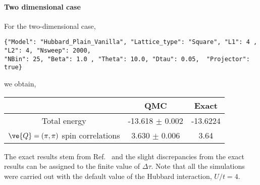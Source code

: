 \paragraph{Two dimensional case}  
For the two-dimensional case, 
\begin{lstlisting}[style=fortran]
{"Model": "Hubbard_Plain_Vanilla", "Lattice_type": "Square", "L1": 4 , "L2": 4, "Nsweep": 2000,  
"NBin": 25, "Beta": 1.0 , "Theta": 10.0, "Dtau": 0.05,  "Projector": true}
\end{lstlisting}
we obtain, \\
\begin{center}
\begin{tabular}{|c|c|c|}
\hline
                  &   QMC  & Exact  \\ \hline
Total energy & -13.618   $\pm $  0.002 &  -13.6224  \\ \hline
 $\ve{Q}=(\pi,\pi)$ spin correlations &  3.630     $ \pm $   0.006     & 3.64 \\ 
 \hline 
\end{tabular}
 \end{center}
 The exact results stem from Ref.~\cite{Parola91}     and the slight discrepancies from the exact results can be  assigned to the finite value of $\Delta \tau$.  Note that all the simulations were carried out with the default value of the Hubbard interaction, $U/t =4$. 
